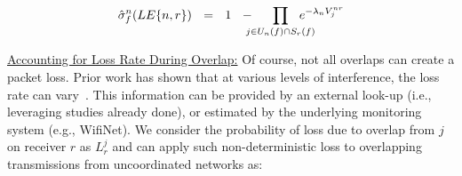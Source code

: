 \vspace{-0.15in}
\begin{equation}
\label{eq:overlap_any}
\hat{\sigma}^n_f(LE\{n,r\})~~=~~ 1~~ - \hspace{-0.1in} \prod\limits_{j \in U_n(f) \cap S_r(f)} \hspace{-0.2in}e^{- \lambda_n V^{nr}_j}
 \end{equation}

%
%

%


\vspace{0.1in}
\noindent \uline{Accounting for Loss Rate During Overlap:}  Of course, not all overlaps can create a packet loss.  Prior work has shown that at various levels of interference, the loss rate can vary~\cite{buzzbuzz}.  This information can be provided by an external look-up (i.e., leveraging studies already done), or estimated by the underlying monitoring system (e.g., WifiNet). We consider the probability of loss due to overlap from $j$ on receiver $r$ as $L^j_r$ and can apply such non-deterministic loss to overlapping transmissions from uncoordinated networks as:



